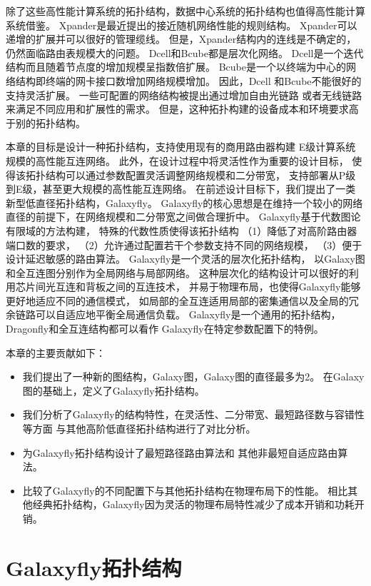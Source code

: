 除了这些高性能计算系统的拓扑结构，数据中心系统的拓扑结构也值得高性能计算系统借鉴。
Xpander是最近提出的接近随机网络性能的规则结构。
Xpander可以递增的扩展并可以很好的管理缆线。
但是，Xpander结构内的连线是不确定的，
仍然面临路由表规模大的问题。
Dcell和Bcube都是层次化网络。
Dcell是一个迭代结构而且随着节点度的增加规模呈指数倍扩展。
Bcube是一个以终端为中心的网络结构即终端的网卡接口数增加网络规模增加。
因此，Dcell 和Bcube不能很好的支持灵活扩展。
一些可配置的网络结构被提出通过增加自由光链路
或者无线链路来满足不同应用和扩展性的需求。
但是，这种拓扑构建的设备成本和环境要求高于别的拓扑结构。

本章的目标是设计一种拓扑结构，支持使用现有的商用路由器构建
E级计算系统规模的高性能互连网络。
此外，在设计过程中将灵活性作为重要的设计目标，
使得该拓扑结构可以通过参数配置灵活调整网络规模和二分带宽，
支持部署从P级到E级，甚至更大规模的高性能互连网络。
在前述设计目标下，我们提出了一类新型低直径拓扑结构，Galaxyfly。
Galaxyfly的核心思想是在维持一个较小的网络直径的前提下，在网络规模和二分带宽之间做合理折中。
Galaxyfly基于代数图论有限域的方法构建，
特殊的代数性质使得该拓扑结构
（1）降低了对高阶路由器端口数的要求，
（2）允许通过配置若干个参数支持不同的网络规模，
（3）便于设计延迟敏感的路由算法。
Galaxyfly是一个灵活的层次化拓扑结构，
以Galaxy图和全互连图分别作为全局网络与局部网络。
这种层次化的结构设计可以很好的利用芯片间光互连和背板之间的互连技术，
并易于物理布局，也使得Galaxyfly能够更好地适应不同的通信模式，
如局部的全互连适用局部的密集通信以及全局的冗余链路可以自适应地平衡全局通信负载。
Galaxyfly是一个通用的拓扑结构，Dragonfly和全互连结构都可以看作
Galaxyfly在特定参数配置下的特例。

本章的主要贡献如下：

\begin{itemize}
\item 我们提出了一种新的图结构，Galaxy图，Galaxy图的直径最多为2。
  在Galaxy图的基础上，定义了Galaxyfly拓扑结构。
\item 我们分析了Galaxyfly的结构特性，在灵活性、二分带宽、最短路径数与容错性等方面
  与其他高阶低直径拓扑结构进行了对比分析。
\item 为Galaxyfly拓扑结构设计了最短路径路由算法和
  其他非最短自适应路由算法。
\item 比较了Galaxyfly的不同配置下与其他拓扑结构在物理布局下的性能。
  相比其他经典拓扑结构，Galaxyfly因为灵活的物理布局特性减少了成本开销和功耗开销。
\end{itemize}

\section{Galaxyfly拓扑结构}

